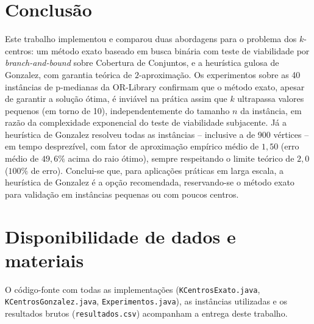 \documentclass[10pt,twocolumn]{article}
\begin{document}
\section{Conclus\~ao}

Este trabalho implementou e comparou duas abordagens para o problema dos $k$-centros: um
m\'etodo exato baseado em busca bin\'aria com teste de viabilidade por
\emph{branch-and-bound} sobre Cobertura de Conjuntos, e a heur\'istica gulosa de
Gonzalez, com garantia te\'orica de $2$-aproxima\c{c}\~ao. Os experimentos sobre as 40
inst\^ancias de p-medianas da OR-Library confirmam que o m\'etodo exato, apesar de
garantir a solu\c{c}\~ao \'otima, \'e invi\'avel na pr\'atica assim que $k$ ultrapassa
valores pequenos (em torno de 10), independentemente do tamanho $n$ da inst\^ancia, em
raz\~ao da complexidade exponencial do teste de viabilidade subjacente. J\'a a
heur\'istica de Gonzalez resolveu todas as inst\^ancias -- inclusive a de 900 v\'ertices
-- em tempo desprez\'ivel, com fator de aproxima\c{c}\~ao emp\'irico m\'edio de
$1{,}50$ (erro m\'edio de $49{,}6\%$ acima do raio \'otimo), sempre respeitando o limite
te\'orico de $2{,}0$ ($100\%$ de erro). Conclui-se que, para
aplica\c{c}\~oes pr\'aticas em larga escala, a heur\'istica de Gonzalez \'e a op\c{c}\~ao
recomendada, reservando-se o m\'etodo exato para valida\c{c}\~ao em inst\^ancias
pequenas ou com poucos centros.

\section*{Disponibilidade de dados e materiais}
O c\'odigo-fonte com todas as implementa\c{c}\~oes (\texttt{KCentrosExato.java},
\texttt{KCentrosGonzalez.java}, \texttt{Experimentos.java}), as inst\^ancias utilizadas
e os resultados brutos (\texttt{resultados.csv}) acompanham a entrega deste trabalho.
\end{document}
